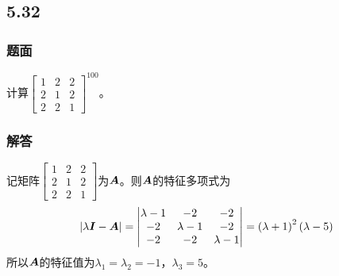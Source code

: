 \documentclass[9pt,xcolor=svgnames]{beamer} %
\begin{document}
\subsection*{5.32}
\begin{frame}
    \frametitle{题面}
    计算\({\begin{bmatrix}1&2&2\\2&1&2\\2&2&1\end{bmatrix}}^{100}\)。
\end{frame}

\begin{frame}[allowframebreaks]
    \frametitle{解答}
    记矩阵\(\begin{bmatrix}1&2&2\\2&1&2\\2&2&1\end{bmatrix}\)为\(\boldsymbol{A}\)。则\(\boldsymbol{A}\)的特征多项式为
    \begin{equation*}
        \left|\lambda\boldsymbol{I}-\boldsymbol{A} \right|=\begin{vmatrix}\lambda-1&-2&-2\\-2&\lambda-1&-2\\-2&-2&\lambda-1\end{vmatrix}=\left( \lambda+1 \right)^2\left( \lambda-5 \right)
    \end{equation*}
    所以\(\boldsymbol{A}\)的特征值为\(\lambda_1=\lambda_2=-1\)，\(\lambda_3=5\)。


\end{frame}
\end{document}
